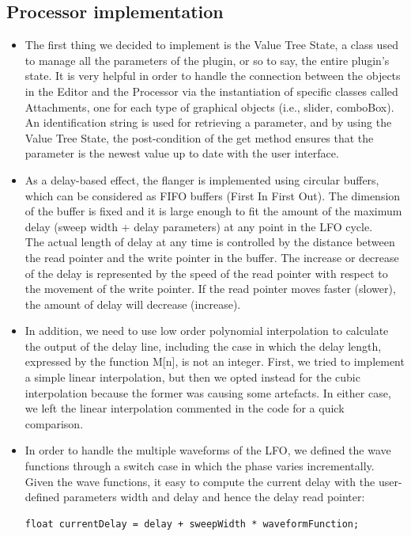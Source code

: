 \documentclass[a4paper,12pt]{report}
\begin{document}
\subsection{Processor implementation}
\begin{itemize}
\item[\textasteriskcentered]The first thing we decided to implement is the Value Tree State, a class used to manage all the parameters of the plugin, or so to say, the entire plugin’s state. It is very helpful in order to handle the connection between the objects in the Editor and the Processor via the instantiation of specific classes called Attachments, one for each type of graphical objects (i.e., slider, comboBox). An identification string is used for retrieving a parameter, and by using the Value Tree State, the post-condition of the get method ensures that the parameter is the newest value up to date with the user interface.  
\item[\textasteriskcentered] As a delay-based effect, the flanger is implemented using circular buffers, which can be considered as FIFO buffers (First In First Out). The dimension of the buffer is fixed and it is large enough to fit the amount of the maximum delay (sweep width + delay parameters) at any point in the LFO cycle.
\\The actual length of delay at any time is controlled by the distance between the read pointer and the write pointer in the buffer. The increase or decrease of the delay is represented by the speed of the read pointer with respect to the movement of the write pointer. If the read pointer moves faster (slower), the amount of delay will decrease (increase).
\item[\textasteriskcentered] In addition, we need to use low order polynomial interpolation to calculate the output of the delay line, including the case in which the delay length, expressed by the function M[n], is not an integer. First, we tried to implement a simple linear interpolation, but then we opted instead for the cubic interpolation because the former was causing some artefacts. In either case, we left the linear interpolation commented in the code for a quick comparison. 
\item[\textasteriskcentered] In order to handle the multiple waveforms of the LFO, we defined the wave functions through a switch case in which the phase varies incrementally. Given the wave functions, it easy to compute the current delay with the user-defined parameters width and delay and hence the delay read pointer:
\begin{verbatim}
float currentDelay = delay + sweepWidth * waveformFunction;
\end{verbatim}
\end{itemize}
\end{document}

